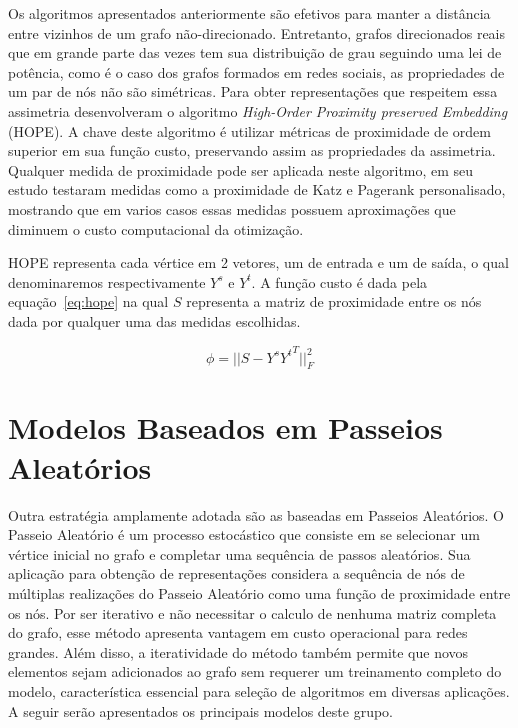 Os algoritmos apresentados anteriormente são efetivos para manter a distância
entre vizinhos de um grafo não-direcionado.
Entretanto, grafos direcionados reais que em grande parte das vezes tem sua
distribuição de grau seguindo uma lei de potência, como é o caso dos grafos
formados em redes sociais, as propriedades de um par de nós não são simétricas.
Para obter representações que respeitem essa assimetria \citet{ou16}
desenvolveram o algoritmo \textit{High-Order Proximity preserved Embedding}
(HOPE).
A chave deste algoritmo é utilizar métricas de proximidade de ordem superior em
sua função custo, preservando assim as propriedades da assimetria.
Qualquer medida de proximidade pode ser aplicada neste algoritmo, \citet{ou16}
em seu estudo testaram medidas como a proximidade de Katz e Pagerank
personalisado, mostrando que em varios casos essas medidas possuem aproximações
que diminuem o custo computacional da otimização.

HOPE representa cada vértice em 2 vetores, um de entrada e um de saída, o qual
denominaremos respectivamente $Y^s$ e $Y^t$.
A função custo é dada pela equação~\ref{eq:hope} na qual $S$ representa a matriz
de proximidade entre os nós dada por qualquer uma das medidas escolhidas.

\begin{equation} \label{eq:hope}
    \phi = \vert\vert S - Y^s {Y^t}^{T} \vert\vert^2_F
\end{equation}

\section{Modelos Baseados em Passeios Aleatórios}

Outra estratégia amplamente adotada são as baseadas em Passeios Aleatórios.
O Passeio Aleatório é um processo estocástico que consiste em se selecionar um
vértice inicial no grafo e completar uma sequência de passos aleatórios.
Sua aplicação para obtenção de representações considera a sequência de nós de
múltiplas realizações do Passeio Aleatório como uma função de proximidade entre
os nós.
Por ser iterativo e não necessitar o calculo de nenhuma matriz completa do
grafo, esse método apresenta vantagem em custo operacional para redes grandes.
Além disso, a iteratividade do método também permite que novos elementos sejam
adicionados ao grafo sem requerer um treinamento completo do modelo,
característica essencial para seleção de algoritmos em diversas aplicações.
A seguir serão apresentados os principais modelos deste grupo.

